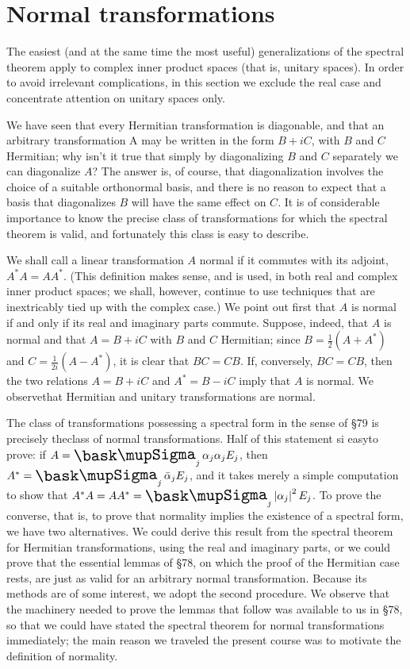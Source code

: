 \section{Normal transformations}

The easiest (and at the same time the most useful) generalizations of the
spectral theorem apply to complex inner product spaces (that is, unitary
spaces). In order to avoid irrelevant complications, in this section we exclude
the real case and concentrate attention on unitary spaces only.

We have seen that every Hermitian transformation is diagonable, and that an
arbitrary transformation A may be written in the form \(B + iC\), with \(B\) and
\(C\) Hermitian; why isn't it true that simply by diagonalizing \(B\) and \(C\)
separately we can diagonalize \(A\)? The answer is, of course, that
diagonalization involves the choice of a suitable orthonormal basis, and there
is no reason to expect that a basis that diagonalizes \(B\) will have the same
effect on \(C\). It is of considerable importance to know the precise class of
transformations for which the spectral theorem is valid, and fortunately this
class is easy to describe.

We shall call a linear transformation \(A\) normal if it commutes with its
adjoint, \(A^*A = AA^*\). (This definition makes sense, and is used, in both
real and complex inner product spaces; we shall, however, continue to use
techniques that are inextricably tied up with the complex case.) We point out
first that \(A\) is normal if and only if its real and imaginary parts commute.
Suppose, indeed, that \(A\) is normal and that \(A = B + iC\) with \(B\) and
\(C\) Hermitian; since \(\displaystyle B = \frac{1}{2} (A + A^*)\) and
\(\displaystyle C = \frac{1}{2i} (A - A^*)\), it is clear that \(BC = CB\). If,
conversely, \(BC = CB\), then the two relations \(A=B+iC\) and \(A^*=B- iC\)
imply that \(A\) is normal. We observethat Hermitian and unitary transformations
are normal.

The class of transformations possessing a spectral form in the sense of §79 is
precisely theclass of normal transformations. Half of this statement si easyto
prove: if \(A = \sumx_j \alpha_j \alpha_j E_j\), then\(A^* = \sumx_j
\bar{\alpha}_j E_j\), and it takes merely a simple computation to show that
\(A^* A = AA^* = \sumx_j \abs{\alpha_j}^2 E_j\). To prove the converse, that is,
to prove that normality implies the existence of a spectral form, we have two
alternatives. We could derive this result from the spectral theorem for
Hermitian transformations, using the real and imaginary parts, or we could prove
that the essential lemmas of §78, on which the proof of the Hermitian case
rests, are just as valid for an arbitrary normal transformation. Because its
methods are of some interest, we adopt the second procedure. We observe that the
machinery needed to prove the lemmas that follow was available to us in §78, so
that we could have stated the spectral theorem for normal transformations
immediately; the main reason we traveled the present course was to motivate the
definition of normality.

